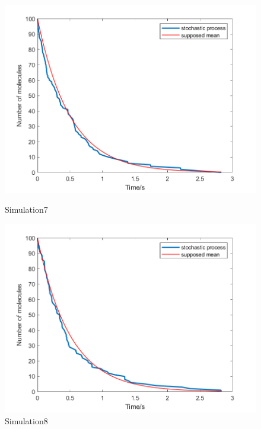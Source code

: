 \documentclass{article}
\begin{document}
\begin{figure}[htbp]
    \centering
    \begin{minipage}{0.45\linewidth}
        \centering
        \includegraphics[width=\linewidth]{graph/b7.png}
        \caption{Simulation7}
        \label{b7}
    \end{minipage}
    \hfill
    \begin{minipage}{0.45\linewidth}
        \centering
        \includegraphics[width=\linewidth]{graph/b8.png}
        \caption{Simulation8}
        \label{b8}
    \end{minipage}
\end{figure}
\end{document}
